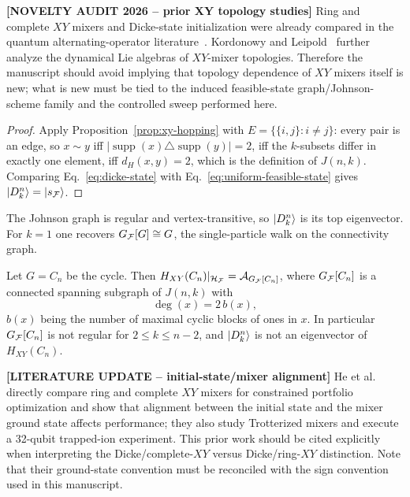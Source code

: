 {\color{red}\textbf{[NOVELTY AUDIT 2026 -- prior XY topology studies]} Ring and complete $XY$ mixers and Dicke-state initialization were already compared in the quantum alternating-operator literature~\cite{Cook2019,Wang2020,He2023}. Kordonowy and Leipold~\cite{Kordonowy2026} further analyze the dynamical Lie algebras of $XY$-mixer topologies. Therefore the manuscript should avoid implying that topology dependence of $XY$ mixers itself is new; what is new must be tied to the induced feasible-state graph/Johnson-scheme family and the controlled sweep performed here.

\begin{proof}
Apply Proposition~\ref{prop:xy-hopping} with $E=\{\{i,j\}:i\neq j\}$: every pair is an edge, so $x\sim y$ iff $|\operatorname{supp}(x)\triangle\operatorname{supp}(y)|=2$, iff the $k$-subsets differ in exactly one element, iff $d_H(x,y)=2$, which is the definition of $J(n,k)$. Comparing Eq.~\eqref{eq:dicke-state} with Eq.~\eqref{eq:uniform-feasible-state} gives $\ket{D^n_k}=\ket{s_{\mathcal{F}}}$.
\end{proof}

\begin{remark} The Johnson graph is regular and vertex-transitive, so
$\ket{D^n_k}$ is its top eigenvector. For $k=1$ one recovers $G_{\mathcal{F}}[G]\cong G$, the single-particle walk on the connectivity graph.
\end{remark}

\begin{corollary}
\label{cor:ring-xy}
Let $G=C_n$ be the cycle. Then $H_{XY}(C_n)|_{\mathcal{H}_{\mathcal{F}}}=\mathcal{A}_{G_{\mathcal{F}}[C_n]}$, where $G_{\mathcal{F}}[C_n]$ is a connected spanning subgraph of $J(n,k)$ with
\begin{equation}
    \deg(x)=2\,b(x),
    \label{eq:ring-degree}
\end{equation}
$b(x)$ being the number of maximal cyclic blocks of ones in $x$. In particular $G_{\mathcal{F}}[C_n]$ is not regular for $2\le k\le n-2$, and $\ket{D^n_k}$ is not an eigenvector of $H_{XY}(C_n)$.
\end{corollary}

{\color{red}\textbf{[LITERATURE UPDATE -- initial-state/mixer alignment]} He et al.~\cite{He2023} directly compare ring and complete $XY$ mixers for constrained portfolio optimization and show that alignment between the initial state and the mixer ground state affects performance; they also study Trotterized mixers and execute a 32-qubit trapped-ion experiment. This prior work should be cited explicitly when interpreting the Dicke/complete-$XY$ versus Dicke/ring-$XY$ distinction. Note that their ground-state convention must be reconciled with the sign convention used in this manuscript.}

}
